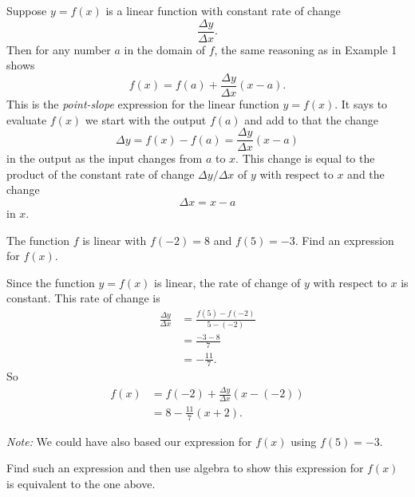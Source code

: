 \documentclass{ximera}
\begin{document}
\begin{example} \label{Exfef3fr3m}
Suppose $y=f(x)$ is a linear function with constant rate of change
\[
  \frac{\Delta y}{\Delta x}.
\]
Then for any number $a$ in the domain of $f$, the same reasoning as in Example 1 shows
\[ 
    f(x) = f(a) + \frac{\Delta y}{\Delta x} \left( x-a \right).
\]
This is the \emph{point-slope} expression for the linear function $y=f(x)$. It says to evaluate $f(x)$ we start with the output $f(a)$ and add to that the change
\[
 \Delta y =  f(x) - f(a) = \frac{\Delta y}{\Delta x} \left( x-a \right)
\]
in the output as the input changes from $a$ to $x$. This change is equal to the product of the constant rate of change $\Delta y/\Delta x$ of $y$ with respect to $x$ and the change
\[
 \Delta x = x-a
\]
in $x$.
\end{example}

\begin{example} \label{Ex3er3}
The function $f$ is linear with $f(-2) = 8$ and $f(5) = -3$. Find an expression for $f(x)$.

\begin{explanation}
Since the function $y=f(x)$ is linear, the rate of change of $y$ with respect to $x$ is constant. This rate of change is
\begin{align*}
    \frac{\Delta y}{\Delta x} &= \frac{f(5) - f(-2)}{5 - (-2)} \\
                                        &= \frac{-3 - 8}{7} \\
                                        &= -\frac{11}{7}.
\end{align*}
So
\begin{align*}
               f(x) &= f(-2) + \frac{\Delta y}{\Delta x}\left( x - (-2) \right) \\
                     &= 8 - \frac{11}{7} \left( x+2 \right).
\end{align*}

\emph{Note:} We could have also based our expression for $f(x)$ using $f(5) = -3$.

Find such an expression and then use algebra to show this expression for $f(x)$ is equivalent to the one above. 

\begin{freeResponse}
\end{freeResponse}
\end{explanation}
\end{example}
\end{document}
